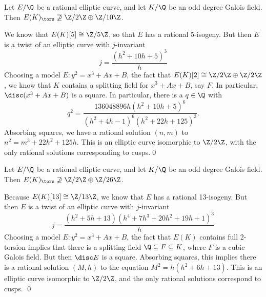 \begin{frame}[plain]
\footnotesize
\begin{lem} 
Let $E/\Q$ be a rational elliptic curve, and let $K/\Q$ be an odd degree Galois field. Then $E(K)_\tors \not\supseteq \Z/2\Z \oplus \Z/10\Z$.
\end{lem} \pspace

\pfsk We know that $E(K)[5] \cong \Z/5\Z$, so that $E$ has a rational 5-isogeny. But then $E$ is a twist of an elliptic curve with $j$-invariant
	\[
	j= \dfrac{(h^2 + 10h + 5)^3}{h}
	\]
Choosing a model $E: y^2= x^3 + Ax + B$, the fact that $E(K)[2] \cong \Z/2\Z \oplus \Z/2\Z$, we know that $K$ contains a splitting field for $x^3 + Ax + B$, say $F$. In particular, $\disc(x^3 + Ax + B)$ is a square. In particular, there is a $q \in \Q$ with
	\[
	q^2= \dfrac{136048896 h (h^2 + 10h + 5)^6}{(h^2 + 4h - 1)^6 (h^2 + 22h + 125)^3}.
	\]
Absorbing squares, we have a rational solution $(n, m)$ to $n^2= m^3 + 22h^2 + 125h$. This is an elliptic curve isomorphic to $\Z/2\Z$, with the only rational solutions corresponding to cusps.\hfill\qed
\end{frame}





\begin{frame}[plain]
\footnotesize
\begin{lem} \label{lem:no2-26odd}
Let $E/\Q$ be a rational elliptic curve, and let $K/\Q$ be an odd degree Galois field. Then $E(K)_\tors \not\supseteq \Z/2\Z \oplus \Z/26\Z$.
\end{lem} \pspace

\pf Because $E(K)[13] \cong \Z/13\Z$, we know that $E$ has a rational 13-isogeny. But then $E$ is a twist of an elliptic curve with $j$-invariant 
	\[
	j= \dfrac{(h^2 + 5h + 13)(h^4 + 7h^3 + 20h^2 + 19h + 1)^3}{h}
	\]
Choosing a model $E: y^2= x^3 + Ax + B$, the fact that $E(K)$ contains full 2-torsion implies that there is a splitting field $\Q \subseteq F \subseteq K$, where $F$ is a cubic Galois field. But then $\disc E$ is a square. Absorbing squares, this implies there is a rational solution $(M, h)$ to the equation $M^2= h(h^2 + 6h + 13)$. This is an elliptic curve isomorphic to $\Z/2\Z$, and the only rational solutions correspond to cusps. \hfill\qed
\end{frame}





\begin{frame}[plain]
\end{frame}





